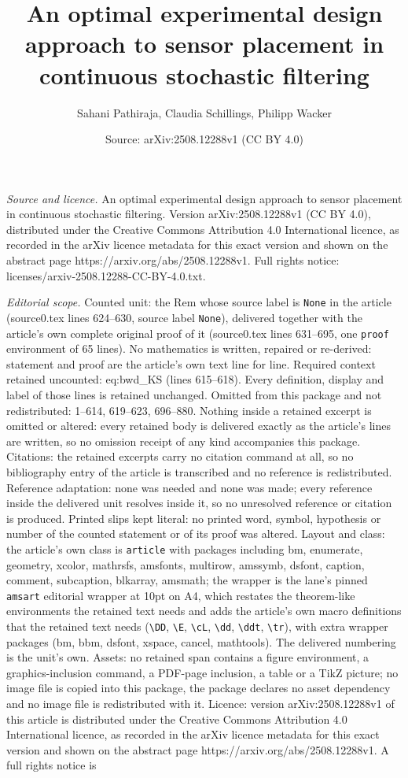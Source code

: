 \documentclass[10pt,a4paper]{amsart}
\title[An optimal experimental design approach to sensor placement ]{An optimal experimental design approach to sensor placement in continuous stochastic filtering}
\author{Sahani Pathiraja, Claudia Schillings, Philipp Wacker}
\date{Source: arXiv:2508.12288v1 (CC BY 4.0)}
\begin{document}
\maketitle

\noindent\emph{Source and licence.} An optimal experimental design approach to sensor placement in continuous stochastic filtering. Version arXiv:2508.12288v1 (CC BY 4.0), distributed under the Creative Commons Attribution 4.0 International licence, as recorded in the arXiv licence metadata for this exact version and shown on the abstract page https://arxiv.org/abs/2508.12288v1. Full rights notice: licenses/arxiv-2508.12288-CC-BY-4.0.txt.\par\smallskip

\noindent\textit{Editorial scope.} Counted unit: the Rem whose source label is \texttt{None} in the article (source0.tex lines 624--630, source label \texttt{None}), delivered together with the article's own complete original proof of it (source0.tex lines 631--695, one \texttt{proof} environment of 65 lines). No mathematics is written, repaired or re-derived: statement and proof are the article's own text line for line. Required context retained uncounted: eq:bwd\_KS (lines 615--618). Every definition, display and label of those lines is retained unchanged. Omitted from this package and not redistributed: 1--614, 619--623, 696--880. Nothing inside a retained excerpt is omitted or altered: every retained body is delivered exactly as the article's lines are written, so no omission receipt of any kind accompanies this package. Citations: the retained excerpts carry no citation command at all, so no bibliography entry of the article is transcribed and no reference is redistributed. Reference adaptation: none was needed and none was made; every reference inside the delivered unit resolves inside it, so no unresolved reference or citation is produced. Printed slips kept literal: no printed word, symbol, hypothesis or number of the counted statement or of its proof was altered. Layout and class: the article's own class is \texttt{article} with packages including bm, enumerate, geometry, xcolor, mathrsfs, amsfonts, multirow, amssymb, dsfont, caption, comment, subcaption, blkarray, amsmath; the wrapper is the lane's pinned \texttt{amsart} editorial wrapper at 10pt on A4, which restates the theorem-like environments the retained text needs and adds the article's own macro definitions that the retained text needs (\texttt{\textbackslash DD}, \texttt{\textbackslash E}, \texttt{\textbackslash cL}, \texttt{\textbackslash dd}, \texttt{\textbackslash ddt}, \texttt{\textbackslash tr}), with extra wrapper packages (bm, bbm, dsfont, xspace, cancel, mathtools). The delivered numbering is the unit's own. Assets: no retained span contains a figure environment, a graphics-inclusion command, a PDF-page inclusion, a table or a TikZ picture; no image file is copied into this package, the package declares no asset dependency and no image file is redistributed with it. Licence: version arXiv:2508.12288v1 of this article is distributed under the Creative Commons Attribution 4.0 International licence, as recorded in the arXiv licence metadata for this exact version and shown on the abstract page https://arxiv.org/abs/2508.12288v1. A full rights notice is 
\end{document}
